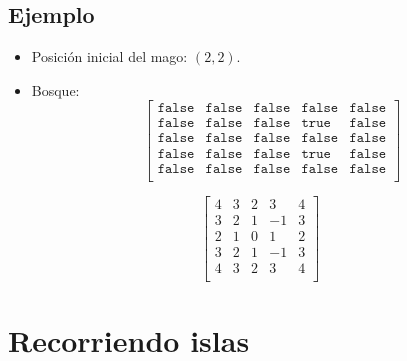 \subsection*{Ejemplo}
\begin{itemize}
        \item Posición inicial del mago: \((2, 2)\).  
        \item Bosque: 
        \[ 
        \begin{bmatrix}
            \texttt{false} & \texttt{false} & \texttt{false} & \texttt{false} & \texttt{false} \\
            \texttt{false} & \texttt{false} & \texttt{false} & \texttt{true}  & \texttt{false} \\
            \texttt{false} & \texttt{false} & \texttt{false} & \texttt{false} & \texttt{false} \\
            \texttt{false} & \texttt{false} & \texttt{false} & \texttt{true}  & \texttt{false} \\
            \texttt{false} & \texttt{false} & \texttt{false} & \texttt{false} & \texttt{false} \\
            \end{bmatrix}
        \]
\end{itemize}
\[
\begin{bmatrix}
4 & 3 & 2 & 3 & 4  \\
3 & 2 & 1 & -1 & 3 \\
2 & 1 & 0 & 1  & 2 \\
3 & 2 & 1 & -1 & 3 \\
4 & 3 & 2 & 3  & 4 \\
\end{bmatrix}
\]

\section{Recorriendo islas}
